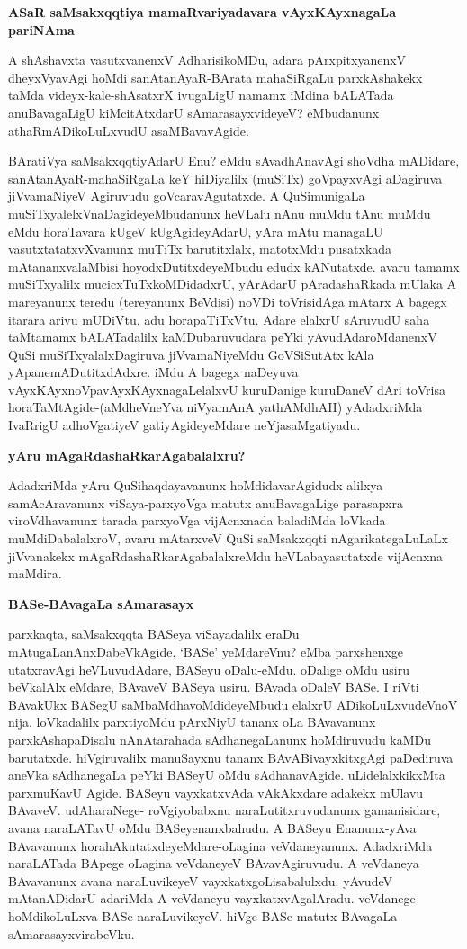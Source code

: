 \noindent
\textbf{ASaR saMsakxqqtiya mamaRvariyadavara vAyxKAyxnagaLa pariNAma}

A shAshavxta vasutxvanenxV AdharisikoMDu, adara pArxpitxyanenxV dheyxVyavAgi hoMdi sanAtanAyaR-BArata mahaSiRgaLu parxkAshakekx taMda videyx-kale-shAsatxrX ivugaLigU namamx iMdina bALATada anuBavagaLigU kiMcitAtxdarU sAmarasayxvideyeV? eMbudanunx athaRmADikoLuLxvudU asaMBavavAgide.

BAratiVya saMsakxqqtiyAdarU Enu? eMdu sAvadhAnavAgi shoVdha mADidare, sanAtanAyaR-mahaSiRgaLa keY hiDiyalilx (muSiTx) goVpayxvAgi aDagiruva jiVvamaNiyeV Agiruvudu goVcaravAgutatxde. A QuSimunigaLa muSiTxyalelxVnaDagideyeMbudanunx heVLalu nAnu muMdu tAnu muMdu eMdu horaTavara kUgeV kUgAgideyAdarU, yAra mAtu managaLU vasutxtatatxvXvanunx muTiTx barutitxlalx, matotxMdu pusatxkada mAtananxvalaMbisi hoyodxDutitxdeyeMbudu edudx kANutatxde. avaru tamamx muSiTxyalilx mucicxTuTxkoMDidadxrU, yArAdarU pAradashaRkada mUlaka A mareyanunx teredu (tereyanunx BeVdisi) noVDi toVrisidAga mAtarx A bagegx itarara arivu mUDiVtu. adu horapaTiTxVtu. Adare elalxrU sAruvudU saha taMtamamx bALATadalilx kaMDubaruvudara peYki yAvudAdaroMdanenxV QuSi muSiTxyalalxDagiruva jiVvamaNiyeMdu GoVSiSutAtx kAla yApanemADutitxdAdxre. iMdu A bagegx naDeyuva vAyxKAyxnoVpavAyxKAyxnagaLelalxvU kuruDanige kuruDaneV dAri toVrisa horaTaMtAgide-(aMdheVneYva niVyamAnA yathAMdhAH\label{24}) yAdadxriMda IvaRrigU adhoVgatiyeV gatiyAgideyeMdare neYjasaMgatiyadu.

\noindent
\textbf{yAru mAgaRdashaRkarAgabalalxru?}

 AdadxriMda yAru QuSihaqdayavanunx hoMdidavarAgidudx alilxya samAcAravanunx viSaya-parxyoVga matutx anuBavagaLige parasapxra viroVdhavanunx tarada parxyoVga vijAcnxnada baladiMda loVkada muMdiDabalalxroV, avaru mAtarxveV QuSi saMsakxqqti nAgarikategaLuLaLx jiVvanakekx mAgaRdashaRkarAgabalalxreMdu heVLabayasutatxde vijAcnxna maMdira.

\noindent
\textbf{BASe-BAvagaLa sAmarasayx}\label{page24}

parxkaqta, saMsakxqqta BASeya viSayadalilx eraDu mAtugaLanAnxDabeVkAgide. `BASe' yeMdareVnu? eMba parxshenxge utatxravAgi heVLuvudAdare, BASeyu oDalu-eMdu. oDalige oMdu usiru beVkalAlx eMdare, BAvaveV BASeya usiru. BAvada oDaleV BASe. I riVti BAvakUkx BASegU saMbaMdhavoMdideyeMbudu elalxrU ADikoLuLxvudeVnoV nija. loVkadalilx parxtiyoMdu pArxNiyU tananx oLa BAvavanunx parxkAshapaDisalu nAnAtarahada sAdhanegaLanunx hoMdiruvudu kaMDu barutatxde. hiVgiruvalilx manuSayxnu tananx BAvABivayxkitxgAgi paDediruva aneVka sAdhanegaLa peYki BASeyU oMdu sAdhanavAgide. uLidelalxkikxMta parxmuKavU Agide. BASeyu vayxkatxvAda vAkAkxdare adakekx mUlavu BAvaveV. udAharaNege- roVgiyobabxnu naraLutitxruvudanunx gamanisidare, avana naraLATavU oMdu BASeyenanxbahudu. A BASeyu Enanunx-yAva BAvavanunx horahAkutatxdeyeMdare-oLagina veVdaneyanunx. AdadxriMda naraLATada BApege oLagina veVdaneyeV BAvavAgiruvudu. A veVdaneya BAvavanunx avana naraLuvikeyeV vayxkatxgoLisabalulxdu. yAvudeV mAtanADidarU adariMda A veVdaneyu vayxkatxvAgalAradu. veVdanege hoMdikoLuLxva BASe naraLuvikeyeV. hiVge BASe matutx BAvagaLa sAmarasayxvirabeVku.

